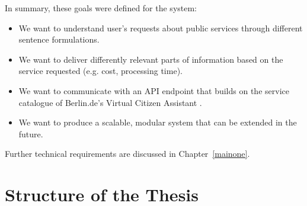 In summary, these goals were defined for the system:

\begin{itemize}
	\item We want to understand user's requests about public services through different sentence formulations.
	
	\item We want to deliver differently relevant parts of information based on the service requested (e.g. cost, processing time).
	
	\item We want to communicate with an API endpoint that builds on the service catalogue of Berlin.de's %
		Virtual Citizen Assistant
.
	
	\item We want to produce a scalable, modular system that can be extended in the future.
\end{itemize}

Further technical requirements are discussed in Chapter~\ref{mainone}.






















\section{Structure of the Thesis}
%

